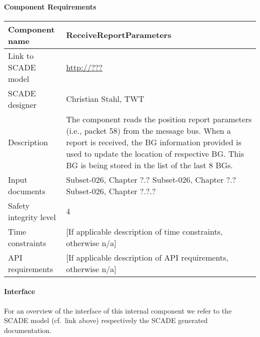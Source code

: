 
\paragraph{Component Requirements}

\begin{longtable}{p{}p{}}
\toprule
Component name			& ReceiveReportParameters \\
\midrule
Link to SCADE model		& {\footnotesize \url{http://???}} \\
\midrule
SCADE designer			& Christian Stahl, TWT \\
\midrule
Description				& The component reads the position report parameters (i.e., packet 58) from the message bus. When a report is received, the BG information provided is used to update the location of respective BG. This BG is being stored in the list of the last 8 BGs. \\
\midrule
Input documents	& 
Subset-026, Chapter ?.?\newline
Subset-026, Chapter ?.?\newline
Subset-026, Chapter ?.?.?\\
\midrule
Safety integrity level		& 4 \\
\midrule
Time constraints		& [If applicable description of time constraints, otherwise n/a] \\
\midrule
API requirements 		& [If applicable description of API requirements, otherwise n/a] \\
\bottomrule
\end{longtable}


\paragraph{Interface}

For an overview of the interface of this internal component we refer to the SCADE model (cf.~link above) respectively the SCADE generated documentation.